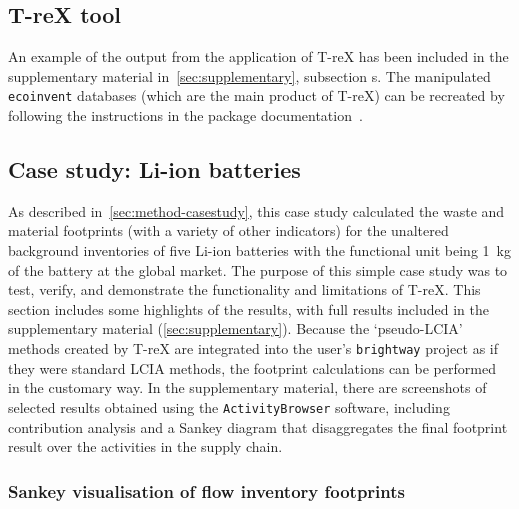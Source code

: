 \subsection{T-reX tool}\label{sec:results-T-reX}

An example of the output from the application of T-reX has been included in the supplementary material in~\autoref{sec:supplementary}, subsection s. The manipulated \texttt{ecoinvent} databases (which are the main product of T-reX) can be recreated by following the instructions in the package documentation~\citep{mcdowall2023T-reXdocs}.

\subsection{Case study: Li-ion batteries}\label{sec:results-casestudy}

As described in~\autoref{sec:method-casestudy}, this case study calculated the waste and material footprints (with a variety of other indicators) for the unaltered background inventories of five Li-ion batteries with the functional unit being 1~kg of the battery at the global market. The purpose of this simple case study was to test, verify, and demonstrate the functionality and limitations of T-reX. This section includes some highlights of the results, with full results included in the supplementary material (\autoref{sec:supplementary}). Because the `pseudo-LCIA' methods created by T-reX are integrated into the user's \texttt{brightway} project as if they were standard LCIA methods, the footprint calculations can be performed in the customary way. In the supplementary material, there are screenshots of selected results obtained using the \texttt{ActivityBrowser} software, including contribution analysis and a Sankey diagram that disaggregates the final footprint result over the activities in the supply chain.

\subsubsection{Sankey visualisation of flow inventory footprints}\label{sec:results-case_study-sankey}

